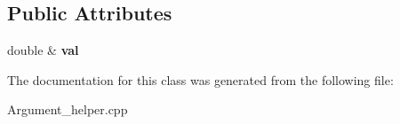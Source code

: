 \subsection*{Public Attributes}
\begin{DoxyCompactItemize}
\item 
\hypertarget{classdsr_1_1_argument__helper_1_1_double_target_a4125e3b92cebd0add6c62428266caace}{
double \& {\bfseries val}}
\label{classdsr_1_1_argument__helper_1_1_double_target_a4125e3b92cebd0add6c62428266caace}

\end{DoxyCompactItemize}


The documentation for this class was generated from the following file:\begin{DoxyCompactItemize}
\item 
Argument\_\-helper.cpp\end{DoxyCompactItemize}
